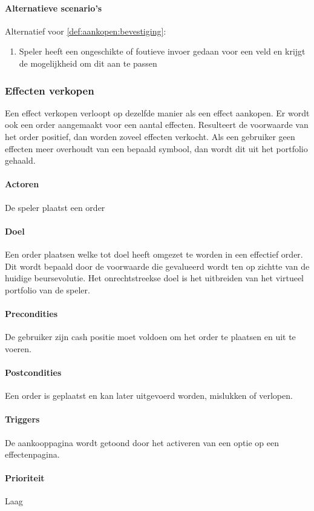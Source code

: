 \paragraph{Alternatieve scenario’s}
Alternatief voor \ref{def:aankopen:bevestiging}:
\begin{enumerate}
 \item Speler heeft een ongeschikte of foutieve invoer gedaan voor een veld en krijgt de mogelijkheid om dit aan te passen
\end{enumerate}

\subsubsection{Effecten verkopen}
Een effect verkopen verloopt op dezelfde manier als een effect aankopen. Er wordt ook een order aangemaakt voor een aantal effecten. Resulteert de voorwaarde van het order positief, dan worden zoveel effecten verkocht. Als een gebruiker geen effecten meer overhoudt van een bepaald symbool, dan wordt dit uit het portfolio gehaald.
\paragraph{Actoren} De speler plaatst een order
\paragraph{Doel} Een order plaatsen welke tot doel heeft omgezet te worden in een effectief order. Dit wordt bepaald door de voorwaarde die gevalueerd wordt ten op zichtte van de huidige beursevolutie. Het onrechtstreekse doel is het uitbreiden van het virtueel portfolio van de speler.
\paragraph{Precondities} De gebruiker zijn cash positie moet voldoen om het order te plaatsen en uit te voeren.
\paragraph{Postcondities} Een order is geplaatst en kan later uitgevoerd worden, mislukken of verlopen.
\paragraph{Triggers} De aankooppagina wordt getoond door het activeren van een optie op een effectenpagina.
\paragraph{Prioriteit}Laag
